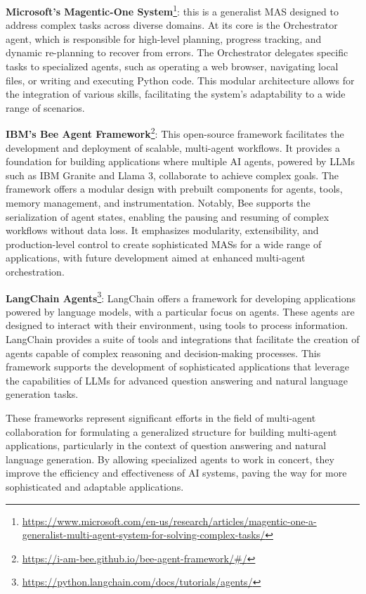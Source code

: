 \documentclass[acmsmall,nonacm]{acmart}
\begin{document}
    \textbf{Microsoft's Magentic-One System}\footnote{\url{https://www.microsoft.com/en-us/research/articles/magentic-one-a-generalist-multi-agent-system-for-solving-complex-tasks/}}: this is a generalist MAS designed to address complex tasks across diverse domains. At its core is the Orchestrator agent, which is responsible for high-level planning, progress tracking, and dynamic re-planning to recover from errors. The Orchestrator delegates specific tasks to specialized agents, such as operating a web browser, navigating local files, or writing and executing Python code. This modular architecture allows for the integration of various skills, facilitating the system's adaptability to a wide range of scenarios.
    
    \textbf{IBM's Bee Agent Framework}\footnote{\url{https://i-am-bee.github.io/bee-agent-framework/\#/}}: This open-source framework facilitates the development and deployment of scalable, multi-agent workflows. It provides a foundation for building applications where multiple AI agents, powered by LLMs such as IBM Granite and Llama 3, collaborate to achieve complex goals. The framework offers a modular design with prebuilt components for agents, tools, memory management, and instrumentation. Notably, Bee supports the serialization of agent states, enabling the pausing and resuming of complex workflows without data loss. It emphasizes modularity, extensibility, and production-level control to create sophisticated MASs for a wide range of applications, with future development aimed at enhanced multi-agent orchestration.
    
    \textbf{LangChain Agents}\footnote{\url{https://python.langchain.com/docs/tutorials/agents/}}: LangChain offers a framework for developing applications powered by language models, with a particular focus on agents. These agents are designed to interact with their environment, using tools to process information. LangChain provides a suite of tools and integrations that facilitate the creation of agents capable of complex reasoning and decision-making processes. This framework supports the development of sophisticated applications that leverage the capabilities of LLMs for advanced question answering and natural language generation tasks.
    
    These frameworks represent significant efforts in the field of multi-agent collaboration for formulating a generalized structure for building multi-agent applications, particularly in the context of question answering and natural language generation. By allowing specialized agents to work in concert, they improve the efficiency and effectiveness of AI systems, paving the way for more sophisticated and adaptable applications.
\end{document}
